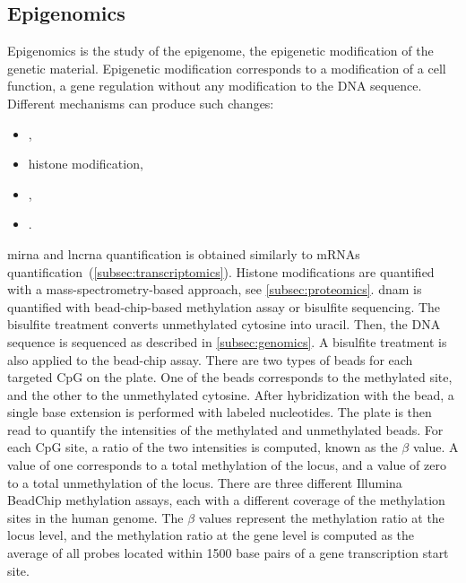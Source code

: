 \documentclass[../main.tex]{subfiles}
\begin{document}
	\subsection{Epigenomics}
		Epigenomics is the study of the epigenome, the epigenetic modification of the genetic material.
		Epigenetic modification corresponds to a modification of a cell function, a gene regulation without any modification to the DNA sequence.
		Different mechanisms can produce such changes:
		\begin{itemize}[nosep]
			\item {},
			\item histone modification,
			\item {},
			\item {}.
		\end{itemize}
		\Gls{mirna} and \gls{lncrna} quantification is obtained similarly to mRNAs quantification~(\cref{subsec:transcriptomics}).
		Histone modifications are quantified with a mass-spectrometry-based approach, see \cref{subsec:proteomics}.
		\Gls{dnam} is quantified with bead-chip-based methylation assay or bisulfite sequencing.
		The bisulfite treatment converts unmethylated cytosine into uracil.
		Then, the DNA sequence is sequenced as described in \cref{subsec:genomics}.
		A bisulfite treatment is also applied to the bead-chip assay.
		There are two types of beads for each targeted CpG on the plate.
		One of the beads corresponds to the methylated site, and the other to the unmethylated cytosine.
		After hybridization with the bead, a single base extension is performed with labeled nucleotides.
		The plate is then read to quantify the intensities of the methylated and unmethylated beads.
		For each CpG site, a ratio of the two intensities is computed, known as the \(\beta\) value.
		A value of one corresponds to a total methylation of the locus, and a value of zero to a total unmethylation of the locus.
		There are three different Illumina BeadChip methylation assays, each with a different coverage of the methylation sites in the human genome.
		The \(\beta\) values represent the methylation ratio at the locus level, and the methylation ratio at the gene level is computed as the average of all probes located within 1500 base pairs of a gene transcription start site.
\end{document}
